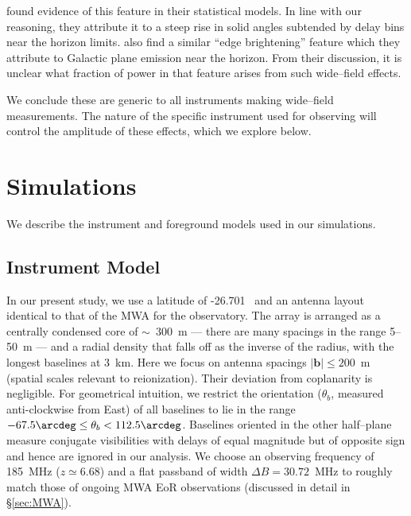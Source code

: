 \documentclass[preprint2,iop,numberedappendix,twocolappendix,appendixfloats]{emulateapj}
\begin{document}
\citet{thy13} found evidence of this feature in their statistical models. In line with our reasoning, they attribute it to a steep rise in solid angles subtended by delay bins near the horizon limits. \citet{pob13} also find a similar ``edge brightening'' feature which they attribute to Galactic plane emission near the horizon. From their discussion, it is unclear what fraction of power in that feature arises from such wide--field effects.

We conclude these are generic to all instruments making wide--field measurements. The nature of the specific instrument used for observing will control the amplitude of these effects, which we explore below. 

\section{Simulations}\label{sec:sim}

We describe the instrument and foreground models used in our simulations. 

\subsection{Instrument Model}\label{sec:instrument_model}

In our present study, we use a latitude of -26.701\arcdeg~ and an antenna layout identical to that of the MWA \citep{bea12} for the observatory. The array is arranged as a centrally condensed core of $\sim$~300~m --- there are many spacings in the range 5--50~m --- and a radial density that falls off as the inverse of the radius, with the longest baselines at 3~km. Here we focus on antenna spacings $|\boldsymbol{b}| \le 200$~m (spatial scales relevant to reionization). Their deviation from coplanarity is negligible. For geometrical intuition, we restrict the orientation ($\theta_b$, measured anti-clockwise from East) of all baselines to lie in the range $-67.5\arcdeg \leq \theta_b < 112.5\arcdeg$. Baselines oriented in the other half--plane measure conjugate visibilities with delays of equal magnitude but of opposite sign and hence are ignored in our analysis. We choose an observing frequency of 185~MHz ($z\simeq 6.68$) and a flat passband of width $\Delta B = 30.72$~MHz to roughly match those of ongoing MWA EoR observations (discussed in detail in \S\ref{sec:MWA}). 
\end{document}
